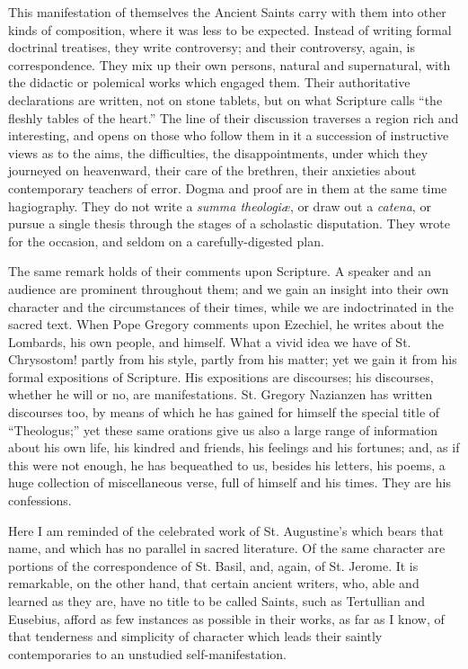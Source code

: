 This manifestation of themselves the Ancient Saints carry with them
into other kinds of composition, where it was less to be expected.
Instead of writing formal doctrinal treatises, they write controversy;
and their controversy, again, is correspondence. They mix up their own
persons, natural and supernatural, with the didactic or polemical
works which engaged them. Their authoritative declarations are
written, not on stone tablets, but on what Scripture calls ``the
fleshly tables of the heart.'' The line of their discussion
traverses a region rich and interesting, and opens on those who follow
them in it a succession of instructive views as to the aims, the
difficulties, the disappointments, under which they journeyed on
heavenward, their care of the brethren, their anxieties about
contemporary teachers of error. Dogma and proof are in them at the
same time hagiography. They do not write a \emph{summa theologiæ}, or
draw out a \emph{catena}, or pursue a single thesis through the stages
of a scholastic disputation. They wrote for the occasion, and seldom
on a carefully-digested plan.

The same remark holds of their comments upon Scripture. A speaker
and an audience are prominent throughout them; and we gain an insight
into their own character and the circumstances of their times, while
we are indoctrinated in the sacred text. When Pope Gregory comments
upon Ezechiel, he writes about the Lombards, his own people, and
himself. What a vivid idea we have of St. Chrysostom! partly from his
style, partly from his matter; yet we gain it from his formal
expositions of Scripture. His expositions are discourses; his
discourses, whether he will or no, are manifestations. St. Gregory
Nazianzen has written discourses too, by means of which he has gained
for himself the special title of ``Theologus;'' yet these same
orations give us also a large range of information about his own life,
his kindred and friends, his feelings and his fortunes; and, as if
this were not enough, he has bequeathed to us, besides his letters,
his poems, a huge collection of miscellaneous verse, full of himself
and his times. They are his confessions.

Here I am reminded of the celebrated work of St. Augustine's which
bears that name, and which has no parallel in sacred literature. Of
the same character are portions of the correspondence of St. Basil,
and, again, of St. Jerome. It is remarkable, on the other hand, that
certain ancient writers, who, able and learned as they are, have no
title to be called Saints, such as Tertullian and Eusebius, afford as
few instances as possible in their works, as far as I know, of that
tenderness and simplicity of character which leads their saintly
contemporaries to an unstudied self-manifestation.

